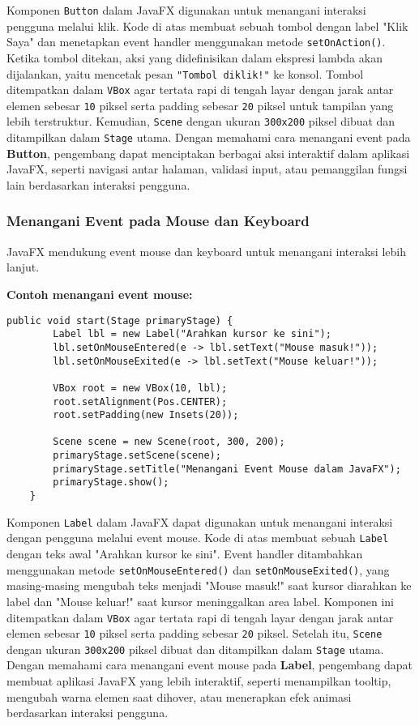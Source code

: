 Komponen \texttt{Button} dalam JavaFX digunakan untuk menangani interaksi pengguna melalui klik. Kode di atas membuat sebuah tombol dengan label "Klik Saya" dan menetapkan event handler menggunakan metode \texttt{setOnAction()}. Ketika tombol ditekan, aksi yang didefinisikan dalam ekspresi lambda akan dijalankan, yaitu mencetak pesan \texttt{"Tombol diklik!"} ke konsol. Tombol ditempatkan dalam \texttt{VBox} agar tertata rapi di tengah layar dengan jarak antar elemen sebesar \texttt{10} piksel serta padding sebesar \texttt{20} piksel untuk tampilan yang lebih terstruktur. Kemudian, \texttt{Scene} dengan ukuran \texttt{300x200} piksel dibuat dan ditampilkan dalam \texttt{Stage} utama. Dengan memahami cara menangani event pada \textbf{Button}, pengembang dapat menciptakan berbagai aksi interaktif dalam aplikasi JavaFX, seperti navigasi antar halaman, validasi input, atau pemanggilan fungsi lain berdasarkan interaksi pengguna.


\subsubsection{Menangani Event pada Mouse dan Keyboard}

JavaFX mendukung event mouse dan keyboard untuk menangani interaksi lebih lanjut.

\textbf{Contoh menangani event mouse:}
\begin{lstlisting}[style=JavaStyle, caption=Menggunakan event mouse dalam JavaFX]
	public void start(Stage primaryStage) {
		Label lbl = new Label("Arahkan kursor ke sini");
		lbl.setOnMouseEntered(e -> lbl.setText("Mouse masuk!"));
		lbl.setOnMouseExited(e -> lbl.setText("Mouse keluar!"));
		
		VBox root = new VBox(10, lbl);
		root.setAlignment(Pos.CENTER);
		root.setPadding(new Insets(20));
		
		Scene scene = new Scene(root, 300, 200);
		primaryStage.setScene(scene);
		primaryStage.setTitle("Menangani Event Mouse dalam JavaFX");
		primaryStage.show();
	}
\end{lstlisting}

Komponen \texttt{Label} dalam JavaFX dapat digunakan untuk menangani interaksi dengan pengguna melalui event mouse. Kode di atas membuat sebuah \texttt{Label} dengan teks awal "Arahkan kursor ke sini". Event handler ditambahkan menggunakan metode \texttt{setOnMouseEntered()} dan \texttt{setOnMouseExited()}, yang masing-masing mengubah teks menjadi "Mouse masuk!" saat kursor diarahkan ke label dan "Mouse keluar!" saat kursor meninggalkan area label. Komponen ini ditempatkan dalam \texttt{VBox} agar tertata rapi di tengah layar dengan jarak antar elemen sebesar \texttt{10} piksel serta padding sebesar \texttt{20} piksel. Setelah itu, \texttt{Scene} dengan ukuran \texttt{300x200} piksel dibuat dan ditampilkan dalam \texttt{Stage} utama. Dengan memahami cara menangani event mouse pada \textbf{Label}, pengembang dapat membuat aplikasi JavaFX yang lebih interaktif, seperti menampilkan tooltip, mengubah warna elemen saat dihover, atau menerapkan efek animasi berdasarkan interaksi pengguna.




